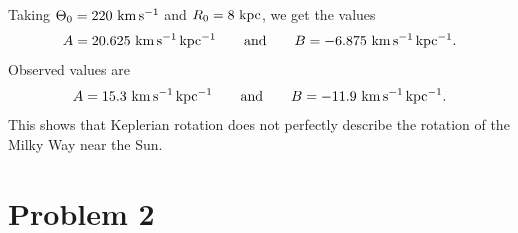 \documentclass[11pt,letterpaper]{article}
\begin{document}
        Taking $\Theta_0 = 220~{\rm km\,s^{-1}}$ and $R_0 = 8~{\rm kpc}$, we get the values 
        \begin{align*}
            A = 20.625~{\rm km\,s^{-1}\,kpc^{-1}} \qquad \text{and} \qquad B = -6.875~{\rm km\,s^{-1}\,kpc^{-1}}.
        \end{align*}
        Observed values are 
        \begin{align*}
            A = 15.3~{\rm km\,s^{-1}\,kpc^{-1}} \qquad \text{and} \qquad B = -11.9~{\rm km\,s^{-1}\,kpc^{-1}}.
        \end{align*}
        This shows that Keplerian rotation does not perfectly describe the rotation of the Milky Way near the Sun. 

\section*{Problem 2}
\end{document}
